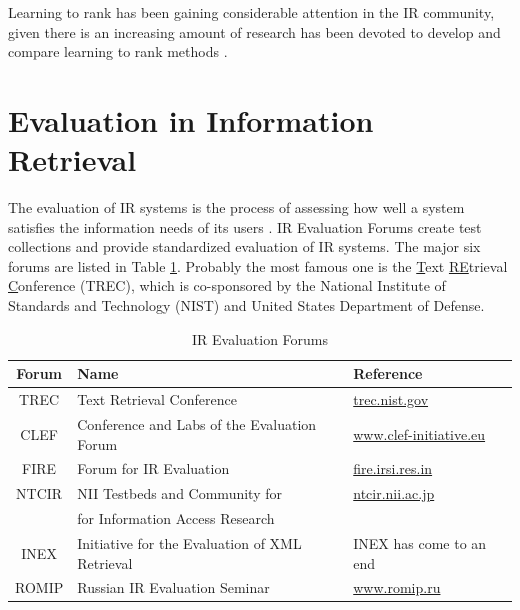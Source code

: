 Learning to rank has been gaining considerable attention in the IR community, given there is an increasing amount of research has been devoted to develop and compare learning to rank methods \citep{87LTR}.

\section{Evaluation in Information Retrieval}
The evaluation of IR systems is the process of assessing how well a system satisfies the information needs of its users \citep{VoorheesIREval}.
IR Evaluation Forums create test collections and provide standardized evaluation of IR systems.
The major six forums are listed in Table \ref{tbl:forums}.
Probably the most famous one is the \underline{T}ext \underline{R}\underline{E}trieval \underline{C}onference (TREC), which is co-sponsored by the National Institute of Standards and Technology (NIST) and United States Department of Defense.

\begin{table}
\caption{IR Evaluation Forums}
\label{tbl:forums}
\centering
\begin{tabular}{| c | l | l |}
\hline 
 \bfseries Forum &  \bfseries Name & \bfseries Reference  \\
\hline 
TREC & Text Retrieval Conference & \url{trec.nist.gov} \\
CLEF & Conference and Labs of the Evaluation Forum & \url{www.clef-initiative.eu} \\
FIRE & Forum for IR Evaluation & \url{fire.irsi.res.in} \\
NTCIR & NII Testbeds and Community for  & \url{ntcir.nii.ac.jp} \\
           &  for Information Access Research &  \\
INEX & Initiative for the Evaluation of XML Retrieval & INEX has come to an end  \\
ROMIP & Russian IR Evaluation Seminar & \url{www.romip.ru} \\
\hline
\end{tabular}
\end{table}

